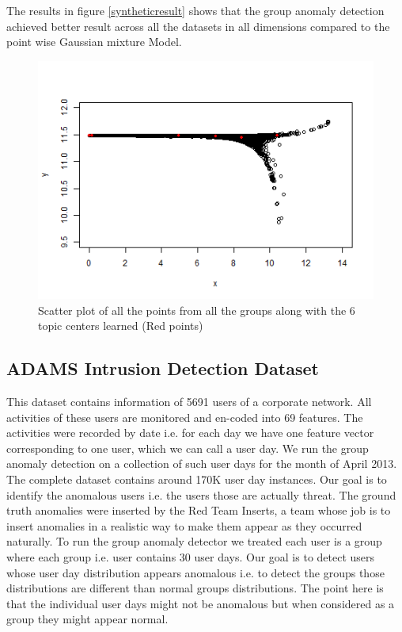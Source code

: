 \documentclass[letterpaper]{article}
\begin{document}
The results in figure \ref{syntheticresult} shows that the group anomaly detection achieved better result across all the datasets in all dimensions compared to the point wise Gaussian mixture Model.

\begin{figure}
\begin{center}
\includegraphics[bb = 0 15 460 290,clip=true,scale=0.9]{Topics.png}
\end{center}
\caption{Scatter plot of all the points from all the groups along with the 6 topic centers learned (Red points)}\label{learnedTopics}
\end{figure}

\subsection{ADAMS Intrusion Detection Dataset}
This dataset contains information of 5691 users of a corporate network. All activities of these users are monitored and en-coded into 69 features. The activities were recorded by date i.e. for each day we have one feature vector corresponding to one user, which we can call a user day. We run the group anomaly detection on a collection of such user days for the month of April 2013. The complete dataset contains around 170K user day instances. Our goal is to identify the anomalous users i.e. the users those are actually threat. The ground truth anomalies were inserted by the Red Team Inserts, a team whose job is to insert anomalies in a realistic way to make them appear as they occurred naturally. To run the group anomaly detector we treated each user is a group where each group i.e. user contains 30 user days. Our goal is to detect users whose user day distribution appears anomalous i.e. to detect the groups those distributions are different than normal groups distributions. The point here is that the individual user days might not be anomalous but when considered as a group they might appear normal.
\end{document}
